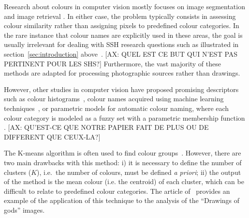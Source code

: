 \documentclass[11pt,a4paper]{article}
\begin{document}
Research about colours in computer vision mostly focuses on image segmentation \cite[see e.g.][]{ChengSun2000,ChenPappasMojsilovicEtAl2005,HanmandluVermaSusanEtAl2013} and image retrieval \cite[see e.g.][]{DengManjunathKenneyEtAl2001,RaoKumar2015,ZhangZhangYaoEtAl2016}. In either case, the problem typically consists in assessing colour similarity rather than assigning pixels to predefined colour categories. In the rare instance that colour names are explicitly used in these areas, the goal is usually irrelevant for dealing with SSH research questions such as illustrated in section~\ref{sec:introduction} above~\cite[see e.g.]{khan2013}. {\color{red}[AX: QUEL EST CE BUT QUI N'EST PAS PERTINENT POUR LES SHS?]} Furthermore, the vast majority of these methods are adapted for processing photographic sources rather than drawings.




However, other studies in computer vision have proposed promising descriptors such as colour histograms~\cite[see e.g.][]{sun2006}, colour names acquired using machine learning techniques~\cite{weijer2009, lindner2013}, or parametric models for automatic colour naming, where each colour category is modeled as a fuzzy set with a parametric membership function \cite{benavente2008}. {\color{red}[AX: QU'EST-CE QUE NOTRE PAPIER FAIT DE PLUS OU DE DIFFERENT QUE CEUX-LA?]}

The K-means algorithm is often used to find colour groups~\cite[see e.g.][]{yendrikhovskij2001,konyushkova2015,hulee2007}. However, there are two main drawbacks with this method: i) it is necessary to define the number of clusters ($K$), i.e.~the number of colours, must be defined \textit{a priori}; ii) the output of the method is the mean colour (i.e. the centroid) of each cluster, which can be difficult to relate to predefined colour categories. The article of~\citet{konyushkova2015} provides an example of the application of this technique to the analysis of the ``Drawings of gods'' images.
\end{document}
